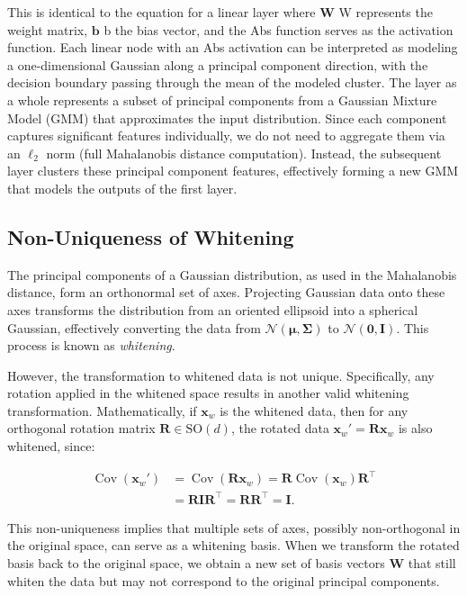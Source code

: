 This is identical to the equation for a linear layer where 
$\boldsymbol{W}$
W represents the weight matrix, 
$\boldsymbol{b}$
b the bias vector, and the Abs function serves as the activation function. Each linear node with an Abs activation can be interpreted as modeling a one-dimensional Gaussian along a principal component direction, with the decision boundary passing through the mean of the modeled cluster. The layer as a whole represents a subset of principal components from a Gaussian Mixture Model (GMM) that approximates the input distribution. Since each component captures significant features individually, we do not need to aggregate them via an $\ell_2$ norm (full Mahalanobis distance computation). Instead, the subsequent layer clusters these principal component features, effectively forming a new GMM that models the outputs of the first layer.

\subsection{Non-Uniqueness of Whitening}

The principal components of a Gaussian distribution, as used in the Mahalanobis distance, form an orthonormal set of axes. Projecting Gaussian data onto these axes transforms the distribution from an oriented ellipsoid into a spherical Gaussian, effectively converting the data from \(\mathcal{N}(\boldsymbol{\mu}, \boldsymbol{\Sigma})\) to \(\mathcal{N}(\mathbf{0}, \mathbf{I})\). This process is known as \emph{whitening}.

However, the transformation to whitened data is not unique. Specifically, any rotation applied in the whitened space results in another valid whitening transformation. Mathematically, if \(\mathbf{x}_w\) is the whitened data, then for any orthogonal rotation matrix \(\mathbf{R} \in \text{SO}(d)\), the rotated data \(\mathbf{x}_w' = \mathbf{R} \mathbf{x}_w\) is also whitened, since:

\begin{align}
\operatorname{Cov}(\mathbf{x}_w') &= \operatorname{Cov}(\mathbf{R} \mathbf{x}_w) = \mathbf{R} \operatorname{Cov}(\mathbf{x}_w) \mathbf{R}^\top \\
&= \mathbf{R} \mathbf{I} \mathbf{R}^\top = \mathbf{R} \mathbf{R}^\top = \mathbf{I}.
\end{align}

This non-uniqueness implies that multiple sets of axes, possibly non-orthogonal in the original space, can serve as a whitening basis. When we transform the rotated basis back to the original space, we obtain a new set of basis vectors \(\mathbf{W}\) that still whiten the data but may not correspond to the original principal components.

